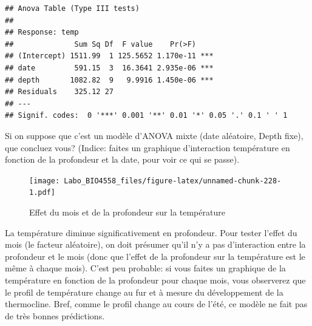 \documentclass[
  12pt,
]{book}
\newenvironment{Shaded}{\begin{snugshade}}{\end{snugshade}}
\newcommand{\DataTypeTok}[1]{\textcolor[rgb]{0.13,0.29,0.53}{#1}}
\newcommand{\DecValTok}[1]{\textcolor[rgb]{0.00,0.00,0.81}{#1}}
\newcommand{\KeywordTok}[1]{\textcolor[rgb]{0.13,0.29,0.53}{\textbf{#1}}}
\newcommand{\NormalTok}[1]{#1}
\newcommand{\OperatorTok}[1]{\textcolor[rgb]{0.81,0.36,0.00}{\textbf{#1}}}
\newcommand{\StringTok}[1]{\textcolor[rgb]{0.31,0.60,0.02}{#1}}
\begin{document}
\begin{Shaded}
\end{Shaded}

\begin{verbatim}
## Anova Table (Type III tests)
## 
## Response: temp
##              Sum Sq Df  F value    Pr(>F)    
## (Intercept) 1511.99  1 125.5652 1.170e-11 ***
## date         591.15  3  16.3641 2.935e-06 ***
## depth       1082.82  9   9.9916 1.450e-06 ***
## Residuals    325.12 27                       
## ---
## Signif. codes:  0 '***' 0.001 '**' 0.01 '*' 0.05 '.' 0.1 ' ' 1
\end{verbatim}

Si on suppose que c'est un modèle d'ANOVA mixte (date aléatoire, Depth fixe), que concluez vous? (Indice: faites un graphique d'interaction température en fonction de la profondeur et la date, pour voir ce qui se passe).

\begin{Shaded}
\end{Shaded}

\begin{figure}
\centering
\texttt{[image: Labo\_BIO4558\_files/figure-latex/unnamed-chunk-228-1.pdf]}
\caption{\label{fig:unnamed-chunk-228}Effet du mois et de la profondeur sur la température}
\end{figure}

La température diminue significativement en profondeur. Pour tester l'effet du mois (le facteur aléatoire), on doit présumer qu'il n'y a pas d'interaction entre la profondeur et le mois (donc que l'effet de la profondeur sur la température est le même à chaque mois). C'est peu probable: si vous faites un graphique de la température en fonction de la profondeur pour chaque mois, vous observerez que le profil de température change au fur et à mesure du développement de la thermocline. Bref, comme le profil change au cours de l'été, ce modèle ne fait pas de très bonnes prédictions.
\end{document}
